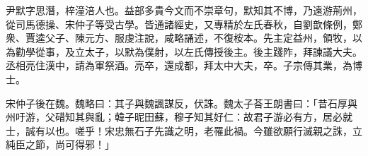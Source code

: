 
\begin{pinyinscope}
尹默字思潛，梓潼涪人也。益部多貴今文而不崇章句，默知其不博，乃遠游荊州，從司馬德操、宋仲子等受古學。皆通諸經史，又專精於左氏春秋，自劉歆條例，鄭衆、賈逵父子、陳元方、服虔注說，咸略誦述，不復桉本。先主定益州，領牧，以為勸學從事，及立太子，以默為僕射，以左氏傳授後主。後主踐阼，拜諫議大夫。丞相亮住漢中，請為軍祭酒。亮卒，還成都，拜太中大夫，卒。子宗傳其業，為博士。

宋仲子後在魏。魏略曰：其子與魏諷謀反，伏誅。魏太子荅王朗書曰：「昔石厚與州吁游，父碏知其與亂；韓子昵田蘇，穆子知其好仁：故君子游必有方，居必就士，誠有以也。嗟乎！宋忠無石子先識之明，老罹此禍。今雖欲願行滅親之誅，立純臣之節，尚可得邪！」


\end{pinyinscope}